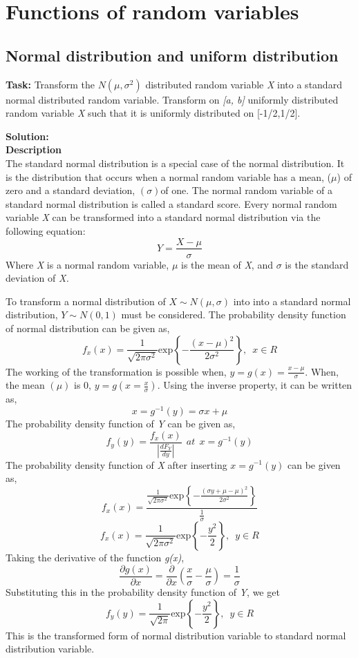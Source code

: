  \chapter{Functions of random variables }

\section{Normal distribution and uniform distribution }
\noindent \textbf{Task:} Transform the $N(\mu, \sigma^2)$ distributed random variable \textit{X} into a standard normal distributed random variable. Transform on \textit{[a, b]} uniformly distributed random variable \textit{X} such that it is uniformly distributed on [-1/2,1/2]. 

\noindent \textbf{Solution:}\\
\noindent \textbf{Description}\\
\noindent The standard normal distribution is a special case of the normal distribution. It is the distribution that occurs when a normal random variable has a mean, ($\mu$) of zero and a standard deviation, $(\sigma)$of one. The normal random variable of a standard normal distribution is called a standard score. Every normal random variable \textit{X} can be transformed into a standard normal distribution via the following equation:
$$ Y = \frac{X-\mu}{\sigma}$$
\noindent Where \textit{X} is a normal random variable, $\mu$ is the mean of \textit{X}, and $\sigma$ is the standard deviation of \textit{X.}

\noindent To transform a normal distribution of $ X \sim N(\mu, \sigma)$ into into a standard normal distribution,  $Y \sim N (0,1)$ must be considered. The probability density function of normal distribution can be given as,
$$f_x(x)=\frac{1}{\sqrt{2\pi\sigma^2}}\text{exp}\left\{-\frac{(x-\mu)^2}{2\sigma^2}\right\}, \; \:  x \in R$$ 
\noindent The working of the transformation is possible when, $ y = g(x) =\frac{x-\mu}{\sigma}$.
\noindent When, the mean $(\mu)$ is 0, $y  = g(x = \frac{x}{\sigma})$. Using the inverse property, it can be written as, 
$$ x = g^{-1}(y) = \sigma x+\mu  $$ 
\noindent The probability density function of \textit{Y} can be given as,
$$f_y(y) = \frac{f_x(x)}{|\frac{dF_Y}{dy}|}\:\:   at \:\: x = g^{-1}(y)$$ 
\noindent The probability density function of \textit{X} after inserting $x = g^{-1}(y)$ can be given as,
$$f_x(x) = \frac{\frac{1}{\sqrt{2\pi\sigma^2}}\text{exp}\left\{-\frac{(\sigma y+\mu-\mu)^2}{2\sigma^2}\right\}}{\frac{1}{\sigma}}$$
$$f_x(x)  = \frac{1}{\sqrt{2\pi\sigma^2}}\text{exp}\left\{-\frac{y^2}{2}\right\}, \; \: y \in R$$
\noindent Taking the derivative of the function \textit{g(x)},
$$ \frac{\partial g(x)}{\partial x} = \frac{\partial}{\partial x}(\frac{x}{\sigma} - \frac{\mu}{\sigma})  = \frac{1}{\sigma}  $$
\noindent Substituting this in the probability density function of \textit{Y}, we get
$$f_y(y)  = \frac{1}{\sqrt{2\pi}}\text{exp}\left\{-\frac{y^2}{2}\right\}, \; \: y \in R$$
\noindent This is the transformed form of normal distribution variable to standard normal distribution variable.

